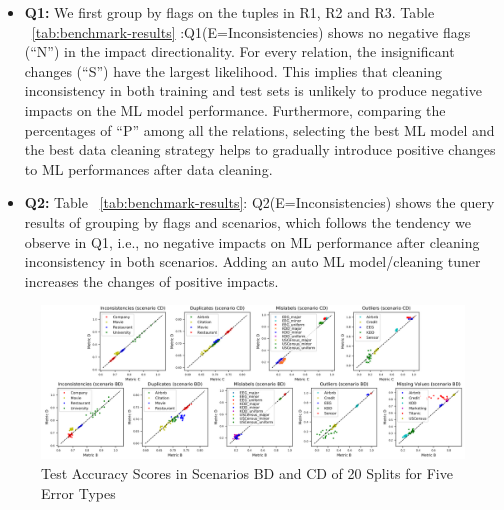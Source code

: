 \begin{itemize}
	\item {
		\textbf{Q1:} We first group by flags on the tuples in R1, R2 and R3. 
		Table ~\ref{tab:benchmark-results} :Q1(E=Inconsistencies) shows no negative flags (“N”) in the impact directionality. For every relation, the insignificant changes
		(“S”) have the largest likelihood. 
		This implies that cleaning inconsistency in both training and test sets is unlikely to produce negative
		impacts on the ML model performance. Furthermore, comparing the percentages of “P” among all the relations, selecting the best ML model and the best data cleaning strategy helps to gradually
		introduce positive changes to ML performances after data cleaning.
	}
	\item {
		\textbf{Q2:} Table ~\ref{tab:benchmark-results}: Q2(E=Inconsistencies) shows the query results
		of grouping by flags and scenarios, which follows the tendency we
		observe in Q1, i.e., no negative impacts on ML performance after cleaning inconsistency in both scenarios. Adding an auto ML model/cleaning tuner increases the changes of positive impacts.
	}
\end{itemize}

\begin{figure}[H]
	\centering
	\includegraphics[angle=-90,scale=.3]{Test_Accuracy_Scores_in_Scenarios_BD_and_CD_of_20_Splits_for_Five_Error_Types}
	\caption{Test Accuracy Scores in Scenarios BD and CD of 20 Splits for Five Error Types}
	\label{fig:Test_Accuracy_Scores_in_Scenarios_BD_and_CD_of_20_Splits_for_Five_Error_Types}
\end{figure}

